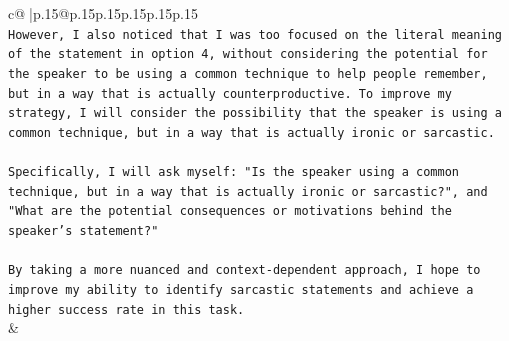 \documentclass{article}
\begin{document}
{\begin{supertabular}{c@{$\;$}|p{.15\linewidth}@{}p{.15\linewidth}p{.15\linewidth}p{.15\linewidth}p{.15\linewidth}p{.15\linewidth}}
{{{\\ 
\texttt{However, I also noticed that I was too focused on the literal meaning of the statement in option 4, without considering the potential for the speaker to be using a common technique to help people remember, but in a way that is actually counterproductive. To improve my strategy, I will consider the possibility that the speaker is using a common technique, but in a way that is actually ironic or sarcastic. } \\
\\ 
\texttt{Specifically, I will ask myself: "Is the speaker using a common technique, but in a way that is actually ironic or sarcastic?", and "What are the potential consequences or motivations behind the speaker's statement?" } \\
\\ 
\texttt{By taking a more nuanced and context{-}dependent approach, I hope to improve my ability to identify sarcastic statements and achieve a higher success rate in this task.} \\
            }
        }
    }
    & \\ \\

\end{supertabular}
}
\end{document}

